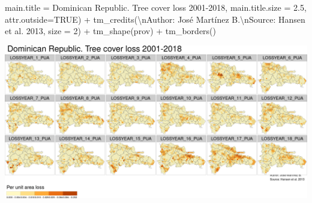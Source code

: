 \documentclass[10pt,landscape,a3paper]{article}
\newenvironment{Shaded}{\begin{snugshade}}{\end{snugshade}}
\newcommand{\AttributeTok}[1]{\textcolor[rgb]{0.77,0.63,0.00}{#1}}
\newcommand{\ConstantTok}[1]{\textcolor[rgb]{0.00,0.00,0.00}{#1}}
\newcommand{\DecValTok}[1]{\textcolor[rgb]{0.00,0.00,0.81}{#1}}
\newcommand{\FloatTok}[1]{\textcolor[rgb]{0.00,0.00,0.81}{#1}}
\newcommand{\FunctionTok}[1]{\textcolor[rgb]{0.00,0.00,0.00}{#1}}
\newcommand{\NormalTok}[1]{#1}
\newcommand{\SpecialCharTok}[1]{\textcolor[rgb]{0.00,0.00,0.00}{#1}}
\newcommand{\StringTok}[1]{\textcolor[rgb]{0.31,0.60,0.02}{#1}}
\begin{document}
\begin{Shaded}
\begin{Highlighting}[]
            \AttributeTok{main.title =} \StringTok{\textquotesingle{}Dominican Republic. Tree cover loss 2001{-}2018\textquotesingle{}}\NormalTok{,}
            \AttributeTok{main.title.size =} \FloatTok{2.5}\NormalTok{, }\AttributeTok{attr.outside=}\ConstantTok{TRUE}\NormalTok{) }\SpecialCharTok{+} 
  \FunctionTok{tm\_credits}\NormalTok{(}\StringTok{\textquotesingle{}}\SpecialCharTok{\textbackslash{}n}\StringTok{Author: José Martínez B.}\SpecialCharTok{\textbackslash{}n}\StringTok{Source: Hansen et al. 2013\textquotesingle{}}\NormalTok{, }\AttributeTok{size =} \DecValTok{2}\NormalTok{) }\SpecialCharTok{+}
  \FunctionTok{tm\_shape}\NormalTok{(prov) }\SpecialCharTok{+} \FunctionTok{tm\_borders}\NormalTok{()}
\end{Highlighting}
\end{Shaded}

\begin{center}\includegraphics{img/data-download-preparation-eda/zonal-long-term-grid-6} \end{center}
\end{document}
